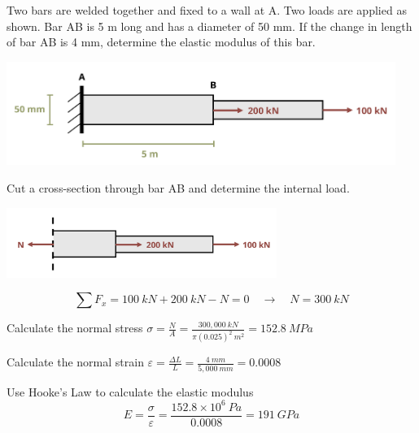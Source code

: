 \documentclass[
  letterpaper,
  DIV=11,
  numbers=noendperiod]{scrreprt}
\theoremstyle{definition}
\theoremstyle{remark}
\begin{document}
\begin{tcolorbox}[enhanced jigsaw, leftrule=.75mm, colbacktitle=quarto-callout-tip-color!10!white, breakable, opacityback=0, colback=white, titlerule=0mm, toprule=.15mm, colframe=quarto-callout-tip-color-frame, coltitle=black, title={Example 4.1}, toptitle=1mm, bottomrule=.15mm, rightrule=.15mm, left=2mm, arc=.35mm, opacitybacktitle=0.6, bottomtitle=1mm]

Two bars are welded together and fixed to a wall at A. Two loads are
applied as shown. Bar AB is 5 m long and has a diameter of 50 mm. If the
change in length of bar AB is 4 mm, determine the elastic modulus of
this bar.

\begin{center}
\includegraphics[width=4.97917in,height=\textheight]{images/CH4 PNGs/example 4.1 part 1.png}
\end{center}

\begin{tcolorbox}[enhanced jigsaw, leftrule=.75mm, colbacktitle=quarto-callout-tip-color!10!white, breakable, opacityback=0, colback=white, titlerule=0mm, toprule=.15mm, colframe=quarto-callout-tip-color-frame, coltitle=black, title={Solution}, toptitle=1mm, bottomrule=.15mm, rightrule=.15mm, left=2mm, arc=.35mm, opacitybacktitle=0.6, bottomtitle=1mm]

Cut a cross-section through bar AB and determine the internal load.

\begin{center}
\includegraphics[width=3.45833in,height=\textheight]{images/CH4 PNGs/example 4.1 part 2.png}
\end{center}

\[
\sum F_x= 100{~kN}+200{~kN}-N=0 \quad\rightarrow\quad N=300{~kN}
\]

Calculate the normal stress
\(\sigma=\frac{N}{A}=\frac{300,000{~kN}}{\pi(0.025)^2{~m}^2}=152.8{~MPa}\)

Calculate the normal strain
\(\varepsilon=\frac{\Delta L}{L}=\frac{4{~mm}}{5,000{~mm}}=0.0008\)

Use Hooke's Law to calculate the elastic modulus \[
E=\frac{\sigma}{\varepsilon}=\frac{152.8 \times 10^6{~Pa}}{0.0008}=191{~GPa}
\]

\end{tcolorbox}

\end{tcolorbox}
\end{document}
